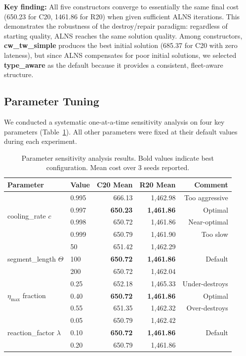 \documentclass[11pt]{article}
\begin{document}
\textbf{Key finding:} All five constructors converge to essentially the same final cost (650.23 for C20, 1461.86 for R20) when given sufficient ALNS iterations. This demonstrates the robustness of the destroy/repair paradigm: regardless of starting quality, ALNS reaches the same solution quality. Among constructors, \textbf{cw\_tw\_simple} produces the best initial solution (685.37 for C20 with zero lateness), but since ALNS compensates for poor initial solutions, we selected \textbf{type\_aware} as the default because it provides a consistent, fleet-aware structure.

\subsection{Parameter Tuning}

We conducted a systematic one-at-a-time sensitivity analysis on four key parameters (Table~\ref{tab:tuning-results}). All other parameters were fixed at their default values during each experiment.

\begin{table}[h]
\centering
\begin{tabular}{@{}llrrr@{}}
\toprule
\textbf{Parameter} & \textbf{Value} & \textbf{C20 Mean} & \textbf{R20 Mean} & \textbf{Comment} \\
\midrule
\multirow{4}{*}{cooling\_rate $c$} & 0.995 & 666.13 & 1,462.98 & Too aggressive \\
& 0.997 & \textbf{650.23} & \textbf{1,461.86} & Optimal \\
& 0.998 & 650.72 & 1,461.86 & Near-optimal \\
& 0.999 & 650.79 & 1,461.90 & Too slow \\
\midrule
\multirow{3}{*}{segment\_length $\Theta$} & 50 & 651.42 & 1,462.29 & \\
& 100 & \textbf{650.72} & \textbf{1,461.86} & Default \\
& 200 & 650.72 & 1,462.04 & \\
\midrule
\multirow{3}{*}{$\eta_{\max}$ fraction} & 0.25 & 652.18 & 1,465.33 & Under-destroys \\
& 0.40 & \textbf{650.72} & \textbf{1,461.86} & Optimal \\
& 0.55 & 651.35 & 1,462.32 & Over-destroys \\
\midrule
\multirow{3}{*}{reaction\_factor $\lambda$} & 0.05 & 650.79 & 1,462.42 & \\
& 0.10 & \textbf{650.72} & \textbf{1,461.86} & Default \\
& 0.20 & 650.79 & 1,461.86 & \\
\bottomrule
\end{tabular}
\caption{Parameter sensitivity analysis results. Bold values indicate best configuration. Mean cost over 3 seeds reported.}
\label{tab:tuning-results}
\end{table}
\end{document}
